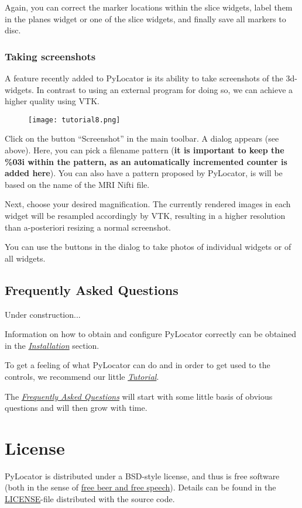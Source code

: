 \documentclass[letterpaper,10pt,english]{sphinxmanual}
\begin{document}
Again, you can correct the marker locations within the slice widgets, label them in the
planes widget or one of the slice widgets, and finally save all markers to disc.


\subsection{Taking screenshots}
\label{tutorial:taking-screenshots}
A feature recently added to PyLocator is its ability to take screenshots of the 3d-widgets.
In contrast to using an external program for doing so, we can achieve a higher quality
using VTK.
\begin{figure}[htbp]
\centering

\texttt{[image: tutorial8.png]}
\end{figure}

Click on the button ``Screenshot'' in the main toolbar. A dialog appears (see above).
Here, you can pick a filename pattern (\textbf{it is important to keep the \%03i within the pattern,
as an automatically incremented counter is added here}). You can also have a pattern proposed
by PyLocator, is will be based on the name of the MRI Nifti file.

Next, choose your desired magnification. The currently rendered images in each widget will be
resampled accordingly by VTK, resulting in a higher resolution than a-posteriori resizing a
normal screenshot.

You can use the buttons in the dialog to take photos of individual widgets or of all widgets.


\section{Frequently Asked Questions}
\label{faq::doc}\label{faq:frequently-asked-questions}
Under construction...

Information on how to obtain and configure PyLocator correctly can be obtained
in the {\hyperref[install::doc]{\emph{Installation}}} section.

To get a feeling of what PyLocator can do and in order to get used to the controls,
we recommend our little {\hyperref[tutorial::doc]{\emph{Tutorial}}}.

The {\hyperref[faq::doc]{\emph{Frequently Asked Questions}}} will start with some little basis of
obvious questions and will then grow with time.


\chapter{License}
\label{index:license}
PyLocator is distributed under a BSD-style license, and
thus is free software (both in the sense of \href{http://en.wikipedia.org/wiki/Gratis\_versus\_Libre}{free beer and free speech}). Details can be found in the
\href{https://github.com/thorstenkranz/PyLocator/blob/master/LICENSE}{LICENSE}-file distributed with the source code.
\end{document}
